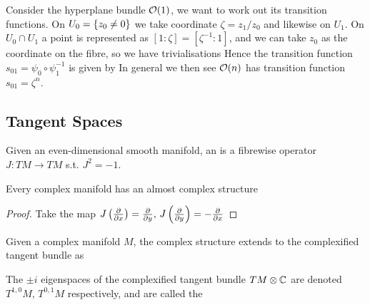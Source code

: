 \documentclass{article}
\begin{document}
\begin{example}
	Consider the hyperplane bundle $\mathcal{O}(1)$, we want to work out its transition functions. On $U_0 = \left\{ z_0 \neq 0 \right\}$ we take coordinate $\zeta = z_1/z_0$ and likewise on $U_1$. On $U_0 \cap U_1$ a point is represented as $[1:\zeta]=[\zeta^{-1}:1]$, and we can take $z_0$ as the coordinate on the fibre, so we have trivialisations
Hence the transition function $s_{01}=\psi_0 \circ \psi_1^{-1}$ is given by 
In general we then see $\mathcal{O}(n)$ has transition function $s_{01}=\zeta^n$. 
\end{example}



\subsection{Tangent Spaces}

\begin{definition}
	Given an even-dimensional smooth manifold, an  is a fibrewise operator $J:TM \to TM$ s.t. $J^2=-1$. 
\end{definition}

\begin{prop}
	Every complex manifold has an almost complex structure
\end{prop}
\begin{proof}
	Take the map $J\left( \frac{\partial}{\partial x} \right) = \frac{\partial}{\partial y}, \, J\left( \frac{\partial}{\partial y} \right) = - \frac{\partial}{\partial x}$
\end{proof}

Given a complex manifold $M$, the complex structure extends to the complexified tangent bundle as 

\begin{definition}
	The $\pm i$ eigenspaces of the complexified tangent bundle $TM\otimes \mathbb{C}$ are denoted $T^{1,0}M, \, T^{0,1}M$ respectively, and are called the 
\end{definition}
\end{document}
